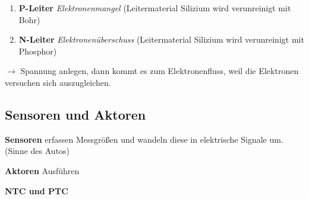 \begin{enumerate}
\item
  \textbf{P-Leiter} \emph{Elektronenmangel} (Leitermaterial Silizium
  wird verunreinigt mit Bohr)
\item
  \textbf{N-Leiter} \emph{Elektronenüberschuss} (Leitermaterial Silizium
  wird verunreinigt mit Phosphor)
\end{enumerate}

$\to$ Spannung anlegen, dann kommt es zum Elektronenfluss, weil die
Elektronen versuchen sich auszugleichen.

\subsection{Sensoren und Aktoren}\label{sensoren-und-aktoren}

\textbf{Sensoren} erfassen Messgrößen und wandeln diese in elektrische
Signale um. (Sinne des Autos)

\textbf{Aktoren} Ausführen

\textbf{NTC und PTC}


